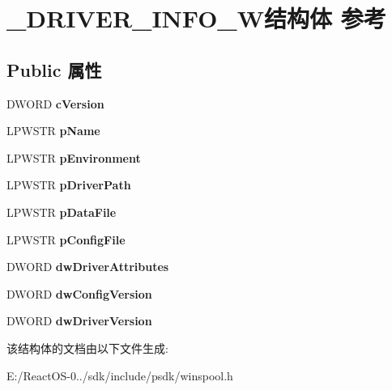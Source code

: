 \hypertarget{struct___d_r_i_v_e_r___i_n_f_o__5_w}{}\section{\+\_\+\+D\+R\+I\+V\+E\+R\+\_\+\+I\+N\+F\+O\+\_\+W结构体 参考}
\label{struct___d_r_i_v_e_r___i_n_f_o__5_w}
\subsection*{Public 属性}
\begin{DoxyCompactItemize}
\item 
\mbox{\label{struct___d_r_i_v_e_r___i_n_f_o__5_w_a640bbb60f440c680c55b8d718dc63f79}} 
D\+W\+O\+RD {\bfseries c\+Version}
\item 
\mbox{\label{struct___d_r_i_v_e_r___i_n_f_o__5_w_a46bda1085b1f1c29939c4b0ce81a4797}} 
L\+P\+W\+S\+TR {\bfseries p\+Name}
\item 
\mbox{\label{struct___d_r_i_v_e_r___i_n_f_o__5_w_af6e1305d8180b5b162b7010b47d05e24}} 
L\+P\+W\+S\+TR {\bfseries p\+Environment}
\item 
\mbox{\label{struct___d_r_i_v_e_r___i_n_f_o__5_w_ae7c5618cdf6facdd980fd8d55d206a34}} 
L\+P\+W\+S\+TR {\bfseries p\+Driver\+Path}
\item 
\mbox{\label{struct___d_r_i_v_e_r___i_n_f_o__5_w_aef44b0072b80bbbb1e6a7bd0ef786bc0}} 
L\+P\+W\+S\+TR {\bfseries p\+Data\+File}
\item 
\mbox{\label{struct___d_r_i_v_e_r___i_n_f_o__5_w_a20b1194280213b92d0f58020d3c833d4}} 
L\+P\+W\+S\+TR {\bfseries p\+Config\+File}
\item 
\mbox{\label{struct___d_r_i_v_e_r___i_n_f_o__5_w_a6560823663763f5b2ea1d1eca8222c1c}} 
D\+W\+O\+RD {\bfseries dw\+Driver\+Attributes}
\item 
\mbox{\label{struct___d_r_i_v_e_r___i_n_f_o__5_w_a1a06117f6d7876b8124bc0b76dabd8f2}} 
D\+W\+O\+RD {\bfseries dw\+Config\+Version}
\item 
\mbox{\label{struct___d_r_i_v_e_r___i_n_f_o__5_w_aff9c47535330f2c49843a08031b1d3d2}} 
D\+W\+O\+RD {\bfseries dw\+Driver\+Version}
\end{DoxyCompactItemize}


该结构体的文档由以下文件生成\+:\begin{DoxyCompactItemize}
\item 
E\+:/\+React\+O\+S-\/0../sdk/include/psdk/winspool.\+h\end{DoxyCompactItemize}
